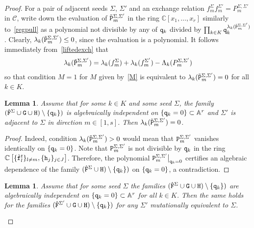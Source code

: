 \documentclass{amsart}
\newtheorem{lemma}[theorem]{Lemma}
\theoremstyle{definition}
\theoremstyle{remark}
\numberwithin{equation}{section}
\numberwithin{theorem}{section}
\def\AA{{\mathbb A}}
\def\C{{\mathbb C}}
\def\CC{{\mathcal C}}
\def\ttf{{\tt f}}
\def\ttg{{\tt g}}
\def\tth{{\tt h}}
\def\ttq{{\tt q}}
\def\ttF{{\tt F}}
\def\ttG{{\tt G}}
\def\ttH{{\tt H}}
\def\ttP{{\tt P}}
\begin{document}
\begin{proof} For a pair of adjacent seeds $\Sigma$, $\Sigma'$ and 
an exchange relation $f_m^\Sigma f_m^{\Sigma'}=P_m^{\Sigma,\Sigma'}$ in $\CC$, write down the evaluation of 
$\tilde\ttP_m^{\Sigma,\Sigma'}$ in the ring $\C[x_1,\dots,x_r]$ similarly to~\eqref{regpull} as a polynomial not divisible by any of $\ttq_k$ %
divided by $\prod_{k\in K}\ttq_k^{\lambda_k(\tilde \ttP_m^{\Sigma,\Sigma'})}$.
Clearly, $\lambda_k(\tilde \ttP_m^{\Sigma,\Sigma'})\le0$, 
since the evaluation is a polynomial. It follows immediately from~\eqref{liftedexch} that
\begin{equation}\label{equaldenom}
\lambda_k(\tilde \ttP_m^{\Sigma,\Sigma'})=\lambda_k(f_m^\Sigma)+\lambda_k(f_m^{\Sigma'})-\Lambda_k(P_m^{\Sigma,\Sigma'})
\end{equation}
so that condition $M=1$ for $M$ given by~\eqref{M} is equivalent to $\lambda_k(\tilde \ttP_m^{\Sigma,\Sigma'})=0$
for all $k\in K$. %

\begin{lemma}\label{onej}
Assume that for some $k\in K$ %
and some seed $\Sigma$, the family 
$(\hat\ttF^\Sigma\cup\ttG\cup\ttH)\setminus\{\ttq_k\})$
is algebraically independent on $\{\ttq_{k}=0\}\subset\AA^r$ and $\Sigma'$ is adjacent to $\Sigma$
in direction $m\in[1,s]$. Then $\lambda_{k}(\tilde \ttP_m^{\Sigma,\Sigma'})=0$.
\end{lemma}

\begin{proof} 
Indeed, condition $\lambda_{k}(\tilde \ttP_m^{\Sigma,\Sigma'})>0$ would mean that $\ttP_m^{\Sigma,\Sigma'}$ vanishes identically on $\{\ttq_{k}=0\}$. Note that $\ttP_m^{\Sigma,\Sigma'}$ is not divisible by $\ttq_{k}$ in the ring 
$\C\left[\{\hat\ttf_l^t\}_{l\ne m}, \{\tth_j\}_{j\in J} \right]$. Therefore, the polynomial
$\ttP_m^{\Sigma,\Sigma'}\bigr\rvert_{\ttq_{k}=0}$
certifies an algebraic dependence of the family $(\hat\ttF^\Sigma\cup\ttH)\setminus\{\ttq_k\})$
on $\{\ttq_{k}=0\}$, a contradiction.
\end{proof}
 
\begin{lemma} 
Assume that for some seed $\Sigma$ the families 
$(\hat\ttF^\Sigma\cup\ttG\cup\ttH)\setminus\{\ttq_{k}\})$
are algebraically independent on $\{\ttq_{k}=0\}\subset\AA^r$ for all $k\in K$.
Then the same holds for the families $(\hat\ttF^{\Sigma'}\cup\ttG\cup\ttH)\setminus\{\ttq_{k}\})$
for any $\Sigma'$ mutationally equivalent to $\Sigma$.
\end{lemma}


\end{proof}
\end{document}
